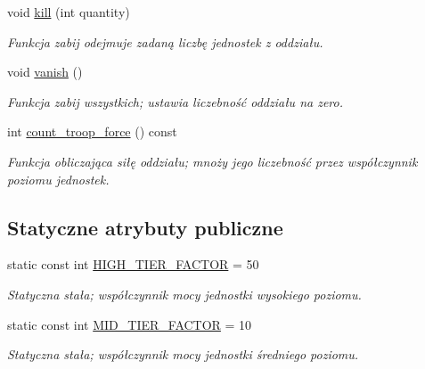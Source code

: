 \begin{DoxyCompactItemize}
\mbox{\label{classmodel_1_1Troop_acba780ecf29542ec3f19c6090f3874d7}} 
void \hyperlink{classmodel_1_1Troop_acba780ecf29542ec3f19c6090f3874d7}{kill} (int quantity)
\begin{DoxyCompactList}\small\item\em Funkcja zabij odejmuje zadaną liczbę jednostek z oddziału. \end{DoxyCompactList}\item 
\mbox{\label{classmodel_1_1Troop_a1d833a9c24e879a224b84f927671b0f0}} 
void \hyperlink{classmodel_1_1Troop_a1d833a9c24e879a224b84f927671b0f0}{vanish} ()
\begin{DoxyCompactList}\small\item\em Funkcja zabij wszystkich; ustawia liczebność oddziału na zero. \end{DoxyCompactList}\item 
\mbox{\label{classmodel_1_1Troop_a5984aee38cb0b8982c28be8f099169db}} 
int \hyperlink{classmodel_1_1Troop_a5984aee38cb0b8982c28be8f099169db}{count\+\_\+troop\+\_\+force} () const
\begin{DoxyCompactList}\small\item\em Funkcja obliczająca siłę oddziału; mnoży jego liczebność przez współczynnik poziomu jednostek. \end{DoxyCompactList}\end{DoxyCompactItemize}
\subsection*{Statyczne atrybuty publiczne}
\begin{DoxyCompactItemize}
\item 
\mbox{\label{classmodel_1_1Troop_a8907a194f9d0b991d2dfe43dd6136984}} 
static const int \hyperlink{classmodel_1_1Troop_a8907a194f9d0b991d2dfe43dd6136984}{H\+I\+G\+H\+\_\+\+T\+I\+E\+R\+\_\+\+F\+A\+C\+T\+OR} = 50
\begin{DoxyCompactList}\small\item\em Statyczna stała; współczynnik mocy jednostki wysokiego poziomu. \end{DoxyCompactList}\item 
\mbox{\label{classmodel_1_1Troop_aedb0cd6437982a339cce8c8918d99650}} 
static const int \hyperlink{classmodel_1_1Troop_aedb0cd6437982a339cce8c8918d99650}{M\+I\+D\+\_\+\+T\+I\+E\+R\+\_\+\+F\+A\+C\+T\+OR} = 10
\begin{DoxyCompactList}\small\item\em Statyczna stała; współczynnik mocy jednostki średniego poziomu. \end{DoxyCompactList}\end{DoxyCompactItemize}


